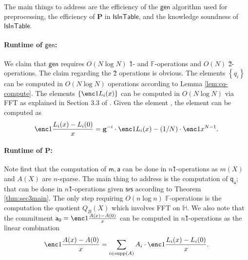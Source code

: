 \documentclass[11pt]{article} %
\newcommand{\F}{\ensuremath{\mathbb F}\xspace}
\newcommand{\srs}{\ensuremath{\mathsf{srs}}\xspace}
\newcommand{\gen}{\ensuremath{\mathsf{gen}}\xspace}
\newcommand{\prv}{\ensuremath{\mathsf{\mathbf{P}}}\xspace}
\newcommand{\set}[1]{\ensuremath{\left\{#1\right\}}\xspace}
\newcommand{\vgen}{\ensuremath{\mathbf{g}}\xspace}
\newcommand{\isintable}{\ensuremath{\mathsf{IsInTable}}\xspace}
\newcommand{\subspace}{\ensuremath{\mathbb{H}}\xspace}
\newcommand{\witsize}{\ensuremath{n}\xspace}
\newcommand{\witruntime}{\ensuremath{\witsize\log\witsize}\xspace}
\newcommand{\tabsize}{\ensuremath{N}\xspace}
\newcommand{\tabruntime}{\ensuremath{\tabsize\log\tabsize}\xspace}
\renewcommand{\a}{\ensuremath{\mathsf{a}}\xspace}
\newcommand{\qa}{\ensuremath{\mathsf{q_a}}\xspace}
\newcommand{\m}{\ensuremath{\mathsf{m}}\xspace}
\newcommand{\zerproof}{\ensuremath{\mathsf{\a}_0}\xspace}
\newcommand{\supp}[1]{\ensuremath{\mathrm{supp}(#1)}\xspace}
\begin{document}
                  
    The  main things to address are the efficiency of the \gen algorithm used for preprocessing, the efficiency of \prv in \isintable, and the knowledge soundness of \isintable.
    
    \paragraph{Runtime of \gen:}
We claim that \gen requires $O(\tabruntime)$ \G1- and \F-operations and $O(\tabsize)$ \G2-operations.
The claim regarding the \G2 operations is obvious.
The elements \set{q_i} can be computed in $O(\tabruntime)$ operations according to Lemma \ref{lem:cq-compute}.
The elements \set{\enc1{L_i(x)}} can be computed in $O(\tabruntime)$ via FFT as explained in Section 3.3 of \cite{FirstMPC}.
Given the element , the element  can be computed as
\[\enc1{\frac{L_i(x)-L_i(0)}{x}}=\vgen^{-i}\cdot \enc1{L_i(x)}- (1/\tabsize)\cdot \enc1{x^{\tabsize-1}}.\]

\paragraph{Runtime of \prv:}
Note first that the computation of $\m,\a$ can be done in \witsize \G1-operations as $m(X)$ and $A(X)$  are $\witsize$-sparse.
The main thing to address is the computation of \qa; that can be done in \witsize \G1-operations given \srs according to Theorem \ref{thm:sec3main}.
The only step requiring $O(\witruntime)$ \F-operations is the computation the quotient $Q_B(X)$ which involves FFT on \subspace.
We also note that the commitment $\zerproof=\enc1{\frac{A(x)-A(0)}{x}}$ can be computed in \witsize \G1-operations
as the linear combination 
\[\enc1{\frac{A(x)-A(0)}{x}} =\sum_{i\in \supp{A}}A_i\cdot \enc1{\frac{L_i(x)-L_i(0)}{x}} . \]
\end{document}
